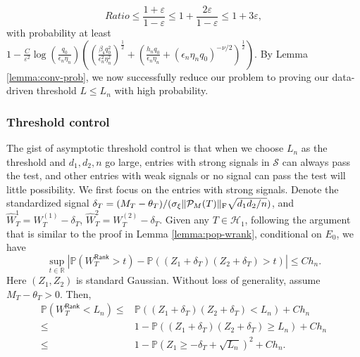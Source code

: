 \documentclass[12pt]{article}
\newcommand{\abs}[1]{\left\lvert#1\right\rvert}
\newcommand{\PP}{\mathbb{P}}
\newcommand{\R}{\mathbb{R}}
\newcommand{\cH}{\mathcal{H}}
\newcommand{\cS}{\mathcal{S}}
\def\calP{{\mathcal P}}
\def\PP{{\mathbb P}}
\theoremstyle{plain}
\begin{document}
\begin{equation*}
     Ratio\le \frac{1+\varepsilon}{1-\varepsilon}\le 1+\frac{2\varepsilon}{1-\varepsilon}\le 1+3\varepsilon,
\end{equation*}
with probability at least $1-\frac{C}{\varepsilon^2} \log(\frac{q_0 }{\epsilon_n \eta_n}) \left( \left(\frac{\beta_{\mathsf{s}} q_0^2 }{ \epsilon_n^2\eta_n^2}\right)^{\frac{1}{2}} + \left(\frac{h_n q_0}{\epsilon_n \eta_n}+(\epsilon_n\eta_n q_0)^{-\nu/2} \right)^{\frac{1}{2}}\right) $. 
By Lemma \ref{lemma:conv-prob}, we now successfully reduce our problem to proving our data-driven threshold $L\le L_n$ with high probability.

\subsubsection{ Threshold control}\label{sec:prof-thres}
 The gist of asymptotic threshold control is that when we choose $L_n$ as the threshold and $d_1,d_2,n$ go large, entries with strong signals in $\cS$ can always pass the test, and other entries with weak signals or no signal can pass the test will little possibility. We first focus on the entries with strong signals. Denote the standardized signal $\delta_T=(M_T-\theta_T)/({\sigma}_{\xi}\|\calP_M(T)\|_{\rm F}\sqrt{d_1d_2/n} )$, and $\widehat{W}^1_T= W^{(1)}_T- \delta_T$, $\widehat{W}^2_T= W^{(2)}_T- \delta_T$. Given any $T\in\cH_1$, following the argument that is similar to the proof in Lemma \ref{lemma:pop-wrank}, conditional on $E_0$, we have 
 \begin{equation*}
    \sup_{t\in \R}\abs{ \PP(W_T^\mathsf{Rank}>t )- \PP\left( (Z_1+\delta_T)(Z_2+\delta_T)>t \right) }\le C h_n.
 \end{equation*}
Here $(Z_1,Z_2)$ is standard Gaussian. Without loss of generality, assume $M_T-\theta_T>0$. Then, 
 \begin{equation*}
\begin{aligned}
\PP(W_T^\mathsf{Rank}< L_n ) \le &\PP\left( (Z_1+\delta_T)(Z_2+\delta_T)< L_n \right) +C h_n \\
\le & 1- \PP\left( (Z_1+\delta_T)(Z_2+\delta_T) \ge L_n \right) +C h_n \\
\le & 1- \PP\left( Z_1\ge -\delta_T+\sqrt{L_n} \right)^2 +C h_n.
\end{aligned}
 \end{equation*}
\end{document}
